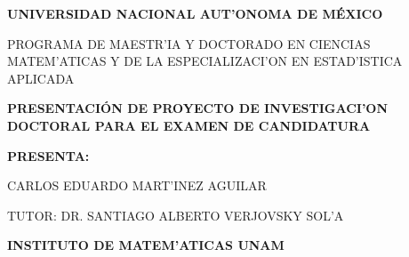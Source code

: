 \documentclass{article}
\begin{document}
\begin{titlepage}
\begin{center}

\LARGE\textbf{ UNIVERSIDAD NACIONAL AUT'ONOMA DE M\'EXICO}
\vspace*{0.3cm}

\small PROGRAMA DE MAESTR'IA Y DOCTORADO EN CIENCIAS MATEM'ATICAS Y DE LA ESPECIALIZACI'ON EN ESTAD'ISTICA APLICADA
\vspace*{2cm}

\large\textbf{PRESENTACI\'ON DE PROYECTO DE INVESTIGACI'ON DOCTORAL PARA EL EXAMEN DE CANDIDATURA}
\vspace*{2cm}

\small\textbf{PRESENTA:}
\vspace*{0.2cm}

\small CARLOS EDUARDO MART'INEZ AGUILAR
\vspace*{0.2cm}

\small TUTOR: DR. SANTIAGO ALBERTO VERJOVSKY SOL'A
\vspace*{0.2cm}

\small \textbf{INSTITUTO DE MATEM'ATICAS UNAM}
\vspace*{2.5cm}
\end{center}

\end{titlepage}

\tableofcontents
\clearpage
\end{document}

